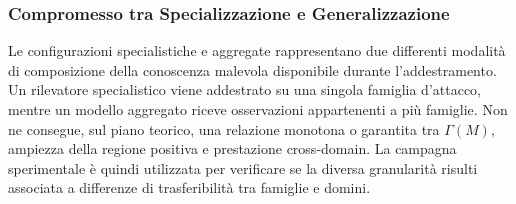 \subsubsection{Compromesso tra Specializzazione e Generalizzazione}
\label{subsubsec:compromesso_rigidita}
Le configurazioni specialistiche e aggregate rappresentano due differenti modalità di composizione della conoscenza malevola disponibile durante l'addestramento. Un rilevatore specialistico viene addestrato su una singola famiglia d'attacco, mentre un modello aggregato riceve osservazioni appartenenti a più famiglie. Non ne consegue, sul piano teorico, una relazione monotona o garantita tra $\Gamma(M)$, ampiezza della regione positiva e prestazione cross-domain. La campagna sperimentale è quindi utilizzata per verificare se la diversa granularità risulti associata a differenze di trasferibilità tra famiglie e domini.

